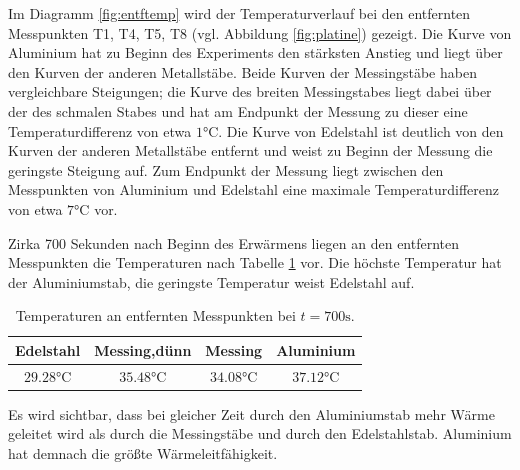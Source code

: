 Im Diagramm \ref{fig:entftemp} wird der Temperaturverlauf bei den entfernten Messpunkten T1, T4, T5, T8 (vgl. Abbildung \ref{fig:platine}) gezeigt. 
Die Kurve von Aluminium hat zu Beginn des Experiments den stärksten Anstieg und liegt über den Kurven der anderen Metallstäbe. 
Beide Kurven der Messingstäbe haben vergleichbare Steigungen;
die Kurve des breiten Messingstabes liegt dabei über der des schmalen Stabes und hat am Endpunkt der Messung zu dieser eine Temperaturdifferenz von etwa $1 \si{\degreeCelsius}$. 
Die Kurve von Edelstahl ist deutlich von den Kurven der anderen Metallstäbe entfernt und weist zu Beginn der Messung die geringste Steigung auf. 
Zum Endpunkt der Messung liegt zwischen den Messpunkten von Aluminium und Edelstahl eine maximale Temperaturdifferenz von etwa $7 \si{\degreeCelsius}$ vor. 

Zirka 700 Sekunden nach Beginn des Erwärmens liegen an den entfernten Messpunkten die Temperaturen nach Tabelle \ref{tab:700} vor. Die höchste Temperatur hat der Aluminiumstab, die geringste Temperatur weist Edelstahl auf.
\begin{table}
	\centering
	\begin{tabular}{cccc}
	\toprule
	{Edelstahl}&{Messing,dünn}&{Messing}&{Aluminium}\\
	\midrule
	$29.28\si{\degreeCelsius}$& $35.48\si{\degreeCelsius}$& $34.08\si{\degreeCelsius}$& $37.12\si{\degreeCelsius}$\\
	\bottomrule
	\end{tabular}
	\caption{Temperaturen an entfernten Messpunkten bei $t=700\si{\second}$.}
	\label{tab:700}
\end{table}

Es wird sichtbar, dass bei gleicher Zeit durch den Aluminiumstab mehr Wärme geleitet wird als durch die Messingstäbe und durch den Edelstahlstab. 
Aluminium hat demnach die größte Wärmeleitfähigkeit.\\

